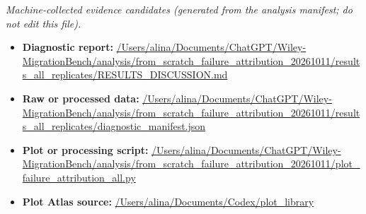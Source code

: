\emph{Machine-collected evidence candidates (generated from the analysis manifest; do not edit this file).}
\begin{itemize}[leftmargin=1.4em,noitemsep]
\item \textbf{Diagnostic report:} \url{/Users/alina/Documents/ChatGPT/Wiley-MigrationBench/analysis/from_scratch_failure_attribution_20261011/results_all_replicates/RESULTS_DISCUSSION.md}
\item \textbf{Raw or processed data:} \url{/Users/alina/Documents/ChatGPT/Wiley-MigrationBench/analysis/from_scratch_failure_attribution_20261011/results_all_replicates/diagnostic_manifest.json}
\item \textbf{Plot or processing script:} \url{/Users/alina/Documents/ChatGPT/Wiley-MigrationBench/analysis/from_scratch_failure_attribution_20261011/plot_failure_attribution_all.py}
\item \textbf{Plot Atlas source:} \url{/Users/alina/Documents/Codex/plot_library}
\end{itemize}
